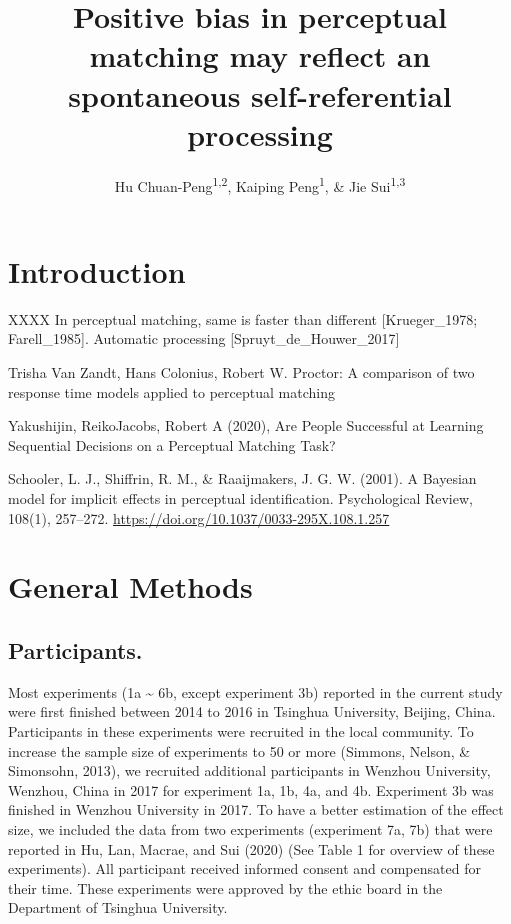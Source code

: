 \documentclass[
  english,
  man]{apa6}
\author{Hu Chuan-Peng\textsuperscript{1,2}, Kaiping Peng\textsuperscript{1}, \& Jie Sui\textsuperscript{1,3}}
\affiliation{
\vspace{0.5cm}
\textsuperscript{1} Tsinghua University, 100084 Beijing, China\\\textsuperscript{2} Leibniz Institute for Resilience Research, 55131 Mainz, Germany\\\textsuperscript{3} University of Aberdeen, Aberdeen, Scotland}
\title{Positive bias in perceptual matching may reflect an spontaneous self-referential processing}
\date{}
\begin{document}
\maketitle

\hypertarget{introduction}{%
\section{Introduction}\label{introduction}}

XXXX
In perceptual matching, same is faster than different {[}Krueger\_1978; Farell\_1985{]}.
Automatic processing {[}Spruyt\_de\_Houwer\_2017{]}

Trisha Van Zandt, Hans Colonius, Robert W. Proctor: A comparison of two response time models applied to perceptual matching

Yakushijin, ReikoJacobs, Robert A (2020), Are People Successful at Learning Sequential Decisions on a Perceptual Matching Task?

Schooler, L. J., Shiffrin, R. M., \& Raaijmakers, J. G. W. (2001). A Bayesian model for implicit effects in perceptual identification. Psychological Review, 108(1), 257--272. \url{https://doi.org/10.1037/0033-295X.108.1.257}

\hypertarget{general-methods}{%
\section{General Methods}\label{general-methods}}

\hypertarget{participants.}{%
\subsection{Participants.}\label{participants.}}

Most experiments (1a \textasciitilde{} 6b, except experiment 3b) reported in the current study were first finished between 2014 to 2016 in Tsinghua University, Beijing, China. Participants in these experiments were recruited in the local community. To increase the sample size of experiments to 50 or more (Simmons, Nelson, \& Simonsohn, 2013), we recruited additional participants in Wenzhou University, Wenzhou, China in 2017 for experiment 1a, 1b, 4a, and 4b. Experiment 3b was finished in Wenzhou University in 2017. To have a better estimation of the effect size, we included the data from two experiments (experiment 7a, 7b) that were reported in Hu, Lan, Macrae, and Sui (2020) (See Table 1 for overview of these experiments).
All participant received informed consent and compensated for their time. These experiments were approved by the ethic board in the Department of Tsinghua University.
\end{document}
